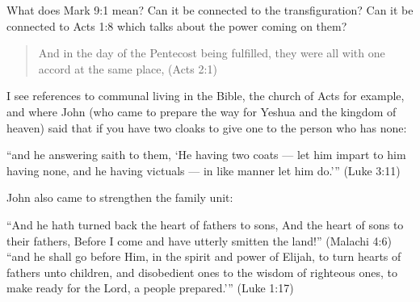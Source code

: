 \documentclass[11pt]{article}
\begin{document}
%
%
%



What does Mark 9:1 mean? Can it be connected to the transfiguration? Can it be connected to Acts 1:8 which talks about the power coming on them? 
\begin{quote}
And in the day of the Pentecost being fulfilled, they were all with one accord at the same place, (Acts 2:1)
\end{quote}


I see references to communal living in the Bible, the church
of Acts for example, and where John (who came to prepare the way for
Yeshua and the kingdom of heaven) said that if you have two cloaks to
give one to the person who has none:

“and he answering saith to them, `He having two coats — let him impart to him having none, and he having victuals — in like manner let him do.’” (Luke 3:11)

John also came to strengthen the family unit:


“And he hath turned back the heart of fathers to sons, And the heart of sons to their fathers, Before I come and have utterly smitten the land!” (Malachi 4:6)
“and he shall go before Him, in the spirit and power of Elijah, to turn hearts of fathers unto children, and disobedient ones to the wisdom of righteous ones, to make ready for the Lord, a people prepared.’” (Luke 1:17)
\end{document}
